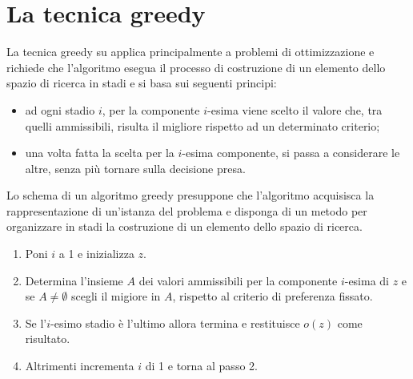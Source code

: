 \documentclass[12pt]{report}
\begin{document}
 	\section{La tecnica greedy}
 	La tecnica greedy su applica principalmente a problemi di ottimizzazione e richiede che l'algoritmo esegua il processo di costruzione di un elemento dello spazio di ricerca in stadi e si basa sui seguenti principi:
 	\begin{itemize}
 		\item ad ogni stadio $i$, per la componente $i$-esima viene scelto il valore che, tra quelli ammissibili, risulta il migliore rispetto ad un determinato criterio;
 		\item una volta fatta la scelta per la $i$-esima componente, si passa a considerare le altre, senza più tornare sulla decisione presa.
 	\end{itemize}
 	Lo schema di un algoritmo greedy presuppone che l'algoritmo acquisisca la rappresentazione di un'istanza del problema e disponga di un metodo per organizzare in stadi la costruzione di un elemento dello spazio di ricerca.
 	\begin{enumerate}
 		\item Poni $i$ a 1 e inizializza $z$.
 		\item Determina l'insieme $A$ dei valori ammissibili per la componente $i$-esima di $z$ e se $A \neq \emptyset$ scegli il migiore in $A$, rispetto al criterio di preferenza fissato.
 		\item Se l'$i$-esimo stadio è l'ultimo allora termina e restituisce $o(z)$ come risultato.
 		\item Altrimenti incrementa $i$ di 1 e torna al passo 2.
 	\end{enumerate}
\end{document}
